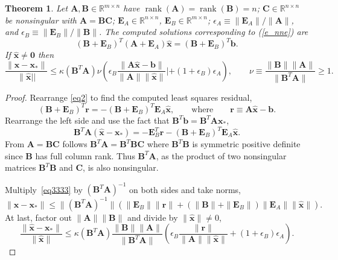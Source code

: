 \documentclass[10pt,a4paper]{amsart}
\newtheorem{theorem}{Theorem}
\newcommand{\inv}{^{-1}}
\newcommand{\ma}{\boldsymbol{A}}
\newcommand{\mb}{\boldsymbol{B}}
\newcommand{\mc}{\boldsymbol{C}}
\newcommand{\me}{\boldsymbol{E}}
\newcommand{\nm}{m}
\newcommand{\nn}{n}
\DeclareMathOperator{\rank}{\mathrm{rank}}
\newcommand{\real}{\mathbb{R}}
\newcommand{\rmn}{{\real}^{\nm \times \nn}}
\newcommand{\rnn}{{\real}^{\nn \times \nn}}
\newcommand{\vb}{\boldsymbol{b}}
\newcommand{\vhx}{\boldsymbol{\hat{\vx}}}
\newcommand{\vr}{\boldsymbol{r}}
\newcommand{\vx}{\boldsymbol{x}}
\newcommand{\vzero}{\boldsymbol{0}}
\begin{document}
\begin{theorem}\label{l_notnorm}
 Let $\ma,\mb\in\rmn$ have $\rank(\ma)=\rank(\mb)=n$;
 $\mc\in\rnn$ be nonsingular with $\ma=\mb\mc$; $\me_A\in\rnn$, $\me_B\in\rmn$; $\epsilon_A\equiv\|\me_A\|/\|\ma\|$, and
$\epsilon_B\equiv\|\me_B\|/\|\mb\|$.
 The computed solutions corresponding to (\ref{e_nne}) are
\begin{equation}\label{eq2}
 (\mb+\me_B)^T(\ma+\me_A)\vhx=(\mb+\me_B)^T\vb.
 \end{equation}
If $\vhx\neq\vzero$ then
    \begin{equation}\label{eqnotnorm}
        \frac{\|\vhx-\vx_*\|}{\|\vhx||}\leq \kappa(\mb^T\ma)\nu\left(\epsilon_B\frac{\|\ma\vhx-\vb\|}{\|\ma\|\|\vhx\|}|+(1+\epsilon_B)\epsilon_A\right), \qquad 
\nu\equiv\frac{\|\mb\|\|\ma\|}{\|\mb^T\ma\|}\geq 1.
    \end{equation}
\end{theorem}

\begin{proof}
Rearrange \eqref{eq2} to find the computed least squares residual,
    \begin{equation*}
        (\mb+\me_B)^T\vr=-(\mb+\me_B)^T\me_A\vhx,
        \qquad \text{where}\qquad \vr\equiv \ma\vhx-\vb.
    \end{equation*}
Rearrange the left side and use the fact that $\mb^T\vb=\mb^T\ma\vx_*$,
\begin{equation}\label{eq3333}
        \mb^T\ma(\vhx-\vx_*)=-\me_B^T\vr-(\mb+\me_B)^T\me_A\vhx.
    \end{equation}
From $\ma=\mb\mc$ follows $\mb^T\ma=\mb^T\mb\mc$ where
$\mb^T\mb$ is symmetric positive definite since $\mb$ has full column rank. Thus $\mb^T\ma$, as the product of two nonsingular matrices $\mb^T\mb$ and $\mc$, is also nonsingular. 

Multiply~\eqref{eq3333} by $(\mb^T\ma)\inv$ on both sides and take norms,
\begin{equation*}
        \|\vhx-\vx_*\|\leq\|(\mb^T\ma)\inv\|\left(\|\me_B\|\|\vr\|+(\|\mb\|+\|\me_B\|)\|\me_A\|\|\vhx\|\right). 
    \end{equation*}
At last, factor out $\|\ma\|\|\mb\|$ and divide by $\|\vhx\|\neq 0$,
        \begin{equation*}
        \frac{\|\vhx-\vx_*\|}{\|\vhx\|}\leq\kappa(\mb^T\ma)\frac{\|\mb\|\|\ma\|}{\|\mb^T\ma\|}\left(\epsilon_B\frac{\|\vr\|}{\|\ma\|\|\vhx\|}+(1+\epsilon_B)\epsilon_A\right).
    \end{equation*}
\end{proof}
\end{document}
